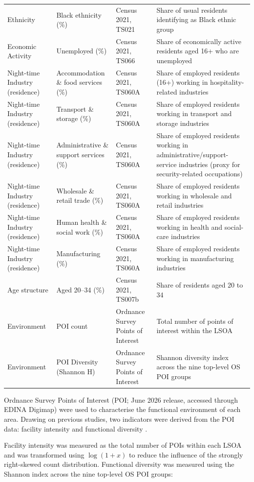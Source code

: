 \begin{longtable}{@{}p{2.8cm} p{3.0cm} p{2.4cm} p{4.6cm}@{}}
Ethnicity & Black ethnicity (\%) & Census 2021, TS021 & Share of usual residents identifying as Black ethnic group \\
Economic Activity & Unemployed (\%) & Census 2021, TS066 & Share of economically active residents aged 16+ who are unemployed \\
Night-time Industry (residence) & Accommodation \& food services (\%) & Census 2021, TS060A & Share of employed residents (16+) working in hospitality-related industries \\
Night-time Industry (residence) & Transport \& storage (\%) & Census 2021, TS060A & Share of employed residents working in transport and storage industries \\
Night-time Industry (residence) & Administrative \& support services (\%) & Census 2021, TS060A & Share of employed residents working in administrative/support-service industries (proxy for security-related occupations) \\
Night-time Industry (residence) & Wholesale \& retail trade (\%) & Census 2021, TS060A & Share of employed residents working in wholesale and retail industries \\
Night-time Industry (residence) & Human health \& social work (\%) & Census 2021, TS060A & Share of employed residents working in health and social-care industries \\
Night-time Industry (residence) & Manufacturing (\%) & Census 2021, TS060A & Share of employed residents working in manufacturing industries \\
Age structure & Aged 20--34 (\%) & Census 2021, TS007b & Share of residents aged 20 to 34 \\
Environment & POI count & Ordnance Survey Points of Interest & Total number of points of interest within the LSOA \\
Environment & POI Diversity (Shannon H) & Ordnance Survey Points of Interest & Shannon diversity index across the nine top-level OS POI groups \\
\end{longtable}

Ordnance Survey Points of Interest (POI; June 2026 release, accessed through EDINA Digimap) \citep{OSPOI2026} were used to characterise the functional environment of each area. Drawing on previous studies, two indicators were derived from the POI data: facility intensity and functional diversity \citep{PeiretGarcia2026}.

Facility intensity was measured as the total number of POIs within each LSOA and was transformed using $\log(1+x)$ to reduce the influence of the strongly right-skewed count distribution. Functional diversity was measured using the Shannon index across the nine top-level OS POI groups:

